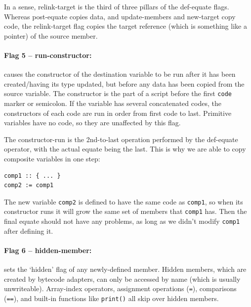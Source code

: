 \documentclass{article}
\newenvironment{code}{
       \begin{list}{}{
               \setlength{\leftmargin}{.4in}
               \setlength{\rightmargin}{0in}
               \setlength{\topsep}{.2in}
       }
       \small
       \item[] }
       { \end{list}   }
\begin{document}
In a sense, relink-target is the third of three pillars of the def-equate flags.  Whereas post-equate copies data, and update-members and new-target copy code, the relink-target flag copies the target reference (which is something like a pointer) of the source member.\\


\paragraph{Flag 5 -- run-constructor:}  causes the constructor of the destination variable to be run after it has been created/having its type updated, but before any data has been copied from the source variable.  The constructor is the part of a script before the first \verb#code# marker or semicolon.  If the variable has several concatenated codes, the constructors of each code are run in order from first code to last.  Primitive variables have no code, so they are unaffected by this flag.

The constructor-run is the 2nd-to-last operation performed by the def-equate operator, with the actual equate being the last.  This is why we are able to copy composite variables in one step:

\begin{code} \begin{verbatim}
comp1 :: { ... }
comp2 := comp1
\end{verbatim} \end{code}

\noindent The new variable \verb#comp2# is defined to have the same code as \verb#comp1#, so when its constructor runs it will grow the same set of members that \verb#comp1# has.  Then the final equate should not have any problems, as long as we didn't modify \verb#comp1# after defining it.\\


\paragraph{Flag 6 -- hidden-member:}  sets the `hidden' flag of any newly-defined member.  Hidden members, which are created by bytecode adapters, can only be accessed by name (which is usually unwriteable).  Array-index operators, assignment operations (\verb#=#), comparisons (\verb#==#), and built-in functions like \verb#print()# all skip over hidden members.\\
\end{document}
